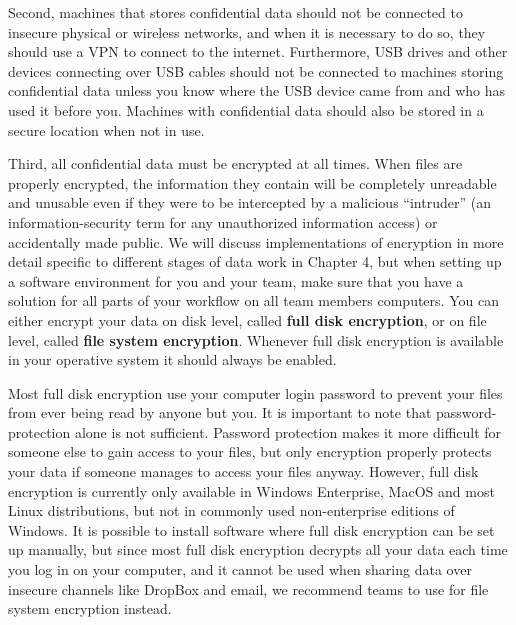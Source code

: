 Second, machines that stores confidential data
should not be connected to insecure physical or wireless networks, 
and when it is necessary to do so, 
they should use a VPN to connect to the internet.
Furthermore, USB drives and other devices connecting over USB cables
should not be connected to machines storing confidential data
unless you know where the USB device came from 
and who has used it before you.
Machines with confidential data should also 
be stored in a secure location when not in use.

Third, all confidential data must be encrypted at all times.
When files are properly encrypted,
the information they contain will be completely unreadable and unusable
even if they were to be intercepted by a malicious ``intruder''
(an information-security term for any unauthorized information access)
or accidentally made public.
We will discuss implementations of encryption in more detail
specific to different stages of data work in Chapter 4,
but when setting up a software environment for you and your team,
make sure that you have a solution for 
all parts of your workflow on all team members computers.
You can either encrypt your data on disk level,
called \textbf{full disk encryption}, or on file level,
called \textbf{file system encryption}.
Whenever full disk encryption is available in your operative system
it should always be enabled. 

Most full disk encryption use your computer login password to
prevent your files from ever being read by anyone but you.
It is important to note that password-protection alone is not sufficient.
Password protection makes it more difficult for someone else to gain access to your files,
but only encryption properly protects your data if someone manages to access your files anyway.
However, full disk encryption is currently only available in 
Windows Enterprise, MacOS and most Linux distributions,
but not in commonly used non-enterprise editions of Windows.
It is possible to install software 
where full disk encryption can be set up manually,
but since most full disk encryption decrypts all your data
each time you log in on your computer,
and it cannot be used when sharing data over insecure channels like DropBox and email,
we recommend teams to use for file system encryption instead.

